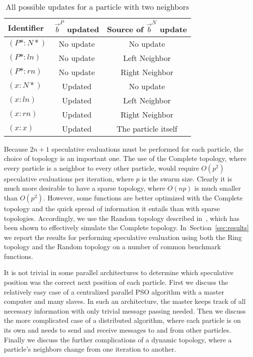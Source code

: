 \documentclass[journal,letterpaper]{IEEEtran}
\renewcommand{\sec}[1]{Section~\ref{sec:#1}}
\providecommand{\pers}{\ensuremath{P}}
\providecommand{\neigh}{\ensuremath{N}}
\providecommand{\nbest}{\ensuremath{\Vec{b}^\neigh}}
\providecommand{\pbest}{\ensuremath{\Vec{b}^\pers}}
\providecommand{\ln}{\ensuremath{ln}}
\providecommand{\rn}{\ensuremath{rn}}
\providecommand{\casexn}{\ensuremath{(x:\neigh*)}}
\providecommand{\casexx}{\ensuremath{(x:x)}}
\providecommand{\casexl}{\ensuremath{(x:\ln)}}
\providecommand{\casexr}{\ensuremath{(x:\rn)}}
\providecommand{\casepn}{\ensuremath{(\pers*:\neigh*)}}
\providecommand{\casepl}{\ensuremath{(\pers*:\ln)}}
\providecommand{\casepr}{\ensuremath{(\pers*:\rn)}}
\begin{document}
\begin{table}
  \caption{All possible updates for a particle with two neighbors}
  \label{tab:evals}
  \centering
  \begin{tabular}{lcc}
	Identifier&$\pbest$ updated&Source of $\nbest$ update\\
	\hline
	\hline
	$\casepn$&No update&No update\\
	\hline
	$\casepl$&No update&Left Neighbor\\
	\hline
	$\casepr$&No update&Right Neighbor\\
	\hline
	$\casexn$&Updated&No update\\
	\hline
	$\casexl$&Updated&Left Neighbor\\
	\hline
	$\casexr$&Updated&Right Neighbor\\
	\hline
	$\casexx$&Updated&The particle itself\\
	\hline
  \end{tabular}
\end{table}

Because $2n+1$ speculative evaluations must be performed for each particle, the
choice of topology is an important one.  The use of the Complete topology,
where every particle is a neighbor to every other particle, would require
$O(p^2)$ speculative evaluations per iteration, where $p$ is the swarm size.
Clearly it is much more desirable to have a sparse topology, where $O(np)$ is
much smaller than $O(p^2)$.  However, some functions are better optimized with
the Complete topology and the quick spread of information it entails than with
sparse topologies.  Accordingly, we use the Random topology described
in~\cite{mcnabb-cec09}, which has been shown to effectively simulate the
Complete topology.  In~\sec{results} we report the results for performing
speculative evaluation using both the Ring topology and the Random topology on
a number of common benchmark functions.

It is not trivial in some parallel architectures to determine which speculative
position was the correct next position of each particle.  First we discuss the
relatively easy case of a centralized parallel PSO algorithm with a master
computer and many slaves.  In such an architecture, the master keeps track of
all necessary information with only trivial message passing needed.  Then we
discuss the more complicated case of a distributed algorithm, where each
particle is on its own and needs to send and receive messages to and from other
particles.  Finally we discuss the further complications of a dynamic topology,
where a particle's neighbors change from one iteration to another.
\end{document}
